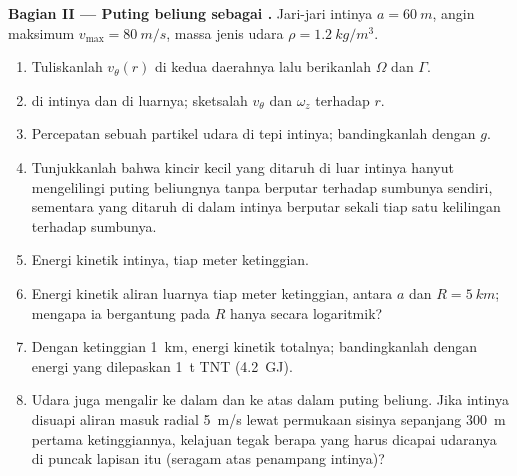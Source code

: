 \begin{problem}
\medskip
\noindent\textbf{Bagian II --- Puting beliung sebagai .}
Jari-jari intinya $a = \qty{60}{m}$, angin maksimum $v_{\max} = \qty{80}{m/s}$, massa jenis
udara $\rho = \qty{1.2}{kg/m^3}$.
\begin{enumerate}[resume]
  \item Tuliskanlah $v_\theta(r)$ di kedua daerahnya lalu berikanlah $\Omega$ dan $\Gamma$.
  \item {} di intinya dan di luarnya; sketsalah $v_\theta$ dan $\omega_z$
        terhadap $r$.
  \item Percepatan sebuah partikel udara di tepi intinya;
        bandingkanlah dengan $g$.
  \item Tunjukkanlah bahwa kincir kecil yang ditaruh di luar intinya
        hanyut mengelilingi puting beliungnya tanpa berputar terhadap
        sumbunya sendiri, sementara yang ditaruh di dalam intinya
        berputar sekali tiap satu kelilingan terhadap sumbunya.
  \item Energi kinetik intinya, tiap meter ketinggian.
  \item Energi kinetik aliran luarnya tiap meter ketinggian, antara
        $a$ dan $R = \qty{5}{km}$; mengapa ia bergantung pada $R$ hanya
        secara logaritmik?
  \item Dengan ketinggian \qty{1}{km}, energi kinetik totalnya;
        bandingkanlah dengan energi yang dilepaskan \qty{1}{t} TNT
        (\qty{4.2}{GJ}).
  \item Udara juga mengalir ke dalam dan ke atas dalam puting beliung.
        Jika intinya disuapi aliran masuk radial \qty{5}{m/s} lewat
        permukaan sisinya sepanjang \qty{300}{m} pertama ketinggiannya,
        kelajuan tegak berapa yang harus dicapai udaranya di puncak
        lapisan itu (seragam atas penampang intinya)?
\end{enumerate}


\end{problem}
